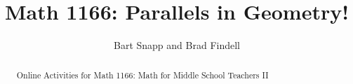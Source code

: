 \documentclass[handout,space,nooutcomes]{xourse}
\title{Math 1166: Parallels in Geometry!}
\author{Bart Snapp and Brad Findell}
\begin{document}
\begin{abstract}
Online Activities for Math 1166: Math for Middle School Teachers II
\end{abstract}
\maketitle

{}
\end{document}
